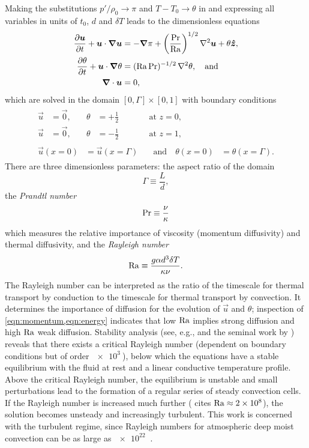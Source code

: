 \documentclass[../main.tex]{subfiles}
\begin{document}
Making the substitutions $p'/\rho_0 \to \pi$ and $T - T_0 \to \theta$ in
 and expressing all variables in
units of $t_0$, $d$ and $\delta T$ leads to the dimensionless equations
\begin{align}
    \label{eqn:momentum}
    \frac{\partial \bm{u}}{\partial t} + \bm{u} \cdot \bm{\nabla} \bm{u}
        &= -\bm{\nabla} \pi + \left( \frac{\mathrm{Pr}}{\mathrm{Ra}}\right)^{1/2}
        \nabla^2 \bm{u} + \theta \bm{\hat{z}}, \\
    \label{eqn:energy}
    \frac{\partial \theta}{\partial t} + \bm{u} \cdot \bm{\nabla} \theta
        &= (\mathrm{Ra}\,\mathrm{Pr})^{-1/2} \, \nabla^2 \theta, \quad \text{and} \\
    \label{eqn:incompressible}
    \bm{\nabla} \cdot \bm{u} &= 0,
\end{align}
which are solved in the domain $[0, \Gamma] \times [0, 1]$ with boundary
conditions
\begin{gather}
\begin{alignat}{3}
    \label{eqn:bc_bot}
    \vec{u} &= \vec{0}, &\quad \theta &= +\frac{1}{2}
    &\qquad& \text{at } z = 0, \\
    \label{eqn:bc_top}
    \vec{u} &= \vec{0}, &\quad \theta &= -\frac{1}{2}
    &\qquad& \text{at } z = 1,
\end{alignat} \\
\begin{alignat}{2}
    \label{eqn:bc_sides}
    \vec{u}(x=0) &= \vec{u}(x=\Gamma)
    &\quad \text{and} \quad \theta(x=0) &= \theta(x=\Gamma).
\end{alignat}
\end{gather}
There are three dimensionless parameters: the aspect ratio of the domain
\[
    \Gamma \equiv \frac{L}{d},
\]
the \emph{Prandtl number}
\[
    \mathrm{Pr} \equiv \frac{\nu}{\kappa}
\]
which measures the relative importance of viscosity (momentum diffusivity) and
thermal diffusivity, and the \emph{Rayleigh number}
\[
    \mathrm{Ra} \equiv \frac{g \alpha d^3 \delta T}{\kappa \nu}.
\]
The Rayleigh number can be interpreted as the ratio of the timescale for
thermal transport by conduction to the timescale for thermal transport by
convection. It determines the importance of diffusion for the evolution of
$\vec{u}$ and $\theta$; inspection of \cref{eqn:momentum,eqn:energy} indicates
that low $\mathrm{Ra}$ implies strong diffusion and high $\mathrm{Ra}$ weak
diffusion. Stability analysis (see, e.g., \textcite{chandrasekhar1961} and the
seminal work by \textcite{rayleigh1916}) reveals that there exists a critical
Rayleigh number (dependent on boundary conditions but of order $\SI{e3}{}$),
below which the equations have a stable equilibrium with the fluid at rest and
a linear conductive temperature profile. Above the critical Rayleigh number,
the equilibrium is unstable and small perturbations lead to the formation of a
regular series of steady convection cells. If the Rayleigh number is increased
much further (\textcite{le_quere1991} cites $\mathrm{Ra} \approx \SI{2e8}{}$),
the solution becomes unsteady and increasingly turbulent. This work is
concerned with the turbulent regime, since Rayleigh numbers for atmospheric
deep moist convection can be as large as $\SI{e22}{}$ \parencite{chilla2012}.
\end{document}
